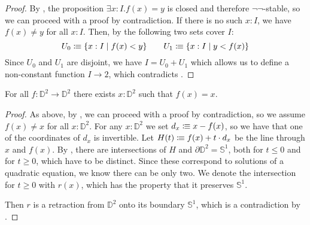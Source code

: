 \begin{proof}
  By , the proposition $\exists x:I.f(x)=y$ is closed and therefore $\neg\neg$-stable, so we can proceed with a proof by contradiction.
  If there is no such $x:I$, we have $f(x)\neq y$ for all $x:I$.
  Then, by  the following two sets cover $I$:
  \[
    U_0\vcentcolon\mspace{-1.2mu}\equiv \{x:I\mid f(x)<y\} \quad\quad
    U_1\vcentcolon\mspace{-1.2mu}\equiv \{x:I\mid y<f(x)\}
    \]
  Since $U_0$ and $U_1$ are disjoint, we have $I=U_0+U_1$ which allows us to define a non-constant function $I\to 2$, which contradicts .
\end{proof}

\begin{theorem}
  For all $f:\mathbb{D}^2\to \mathbb{D}^2$ there exists $x:\mathbb{D}^2$ such that $f(x)=x$.
\end{theorem}

\begin{proof}
  As above, by , we can proceed with a proof by contradiction,
  so we assume $f(x)\neq x$ for all $x:\mathbb{D}^2$.
  For any $x:\mathbb{D}^2$ we set $d_x\vcentcolon\mspace{-1.2mu}\equiv x-f(x)$, so we have that one of the coordinates of $d_x$ is invertible.
  Let $H(t)\vcentcolon\mspace{-1.2mu}\equiv f(x) + t\cdot d_x $ be the line through $x$ and $f(x)$.
  By , there are intersections of $H$ and $\partial\mathbb{D}^2=\mathbb{S}^1$, both for $t\leq 0$ and for $t\geq 0$, which have to be distinct.
  Since these correspond to solutions of a quadratic equation, we know there can be only two.
  We denote the intersection for $t\geq 0$ with $r(x)$, which has the property that it preserves $\mathbb{S}^1$.
  
  Then $r$ is a retraction from $\mathbb{D}^2$ onto its boundary $\mathbb{S}^1$, which is a contradiction by .
\end{proof}
